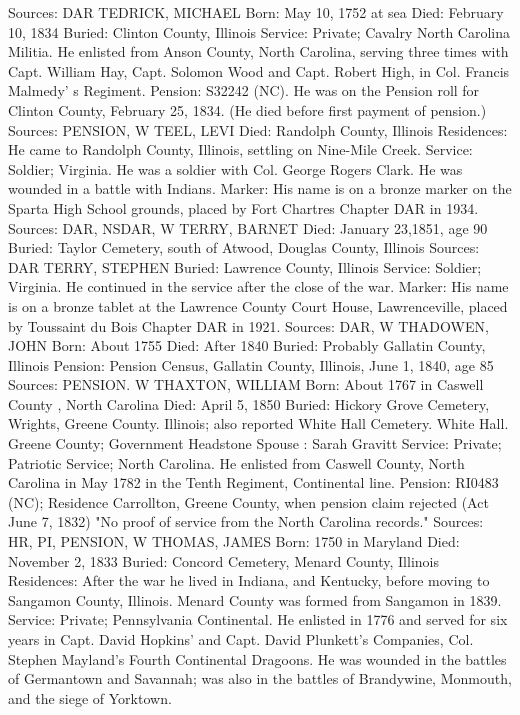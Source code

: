 Sources: DAR 
TEDRICK, MICHAEL 
Born: May 10, 1752 at sea
Died: February 10, 1834
Buried: Clinton County, Illinois
Service: Private; Cavalry North Carolina Militia. He enlisted from Anson County, North Carolina, serving three times with Capt. William Hay, Capt. Solomon Wood and Capt. Robert High, in Col. Francis Malmedy' s Regiment. 
Pension: S32242 (NC). He was on the Pension roll for Clinton County, February 25, 1834. (He died before first payment of pension.)
Sources: PENSION, W 
TEEL, LEVI
Died: Randolph County, Illinois Residences: He came to Randolph County, Illinois, settling on Nine-Mile Creek.
Service: Soldier; Virginia. He was a soldier with Col. George Rogers Clark. He was wounded in a battle with Indians.
Marker: His name is on a bronze marker on the Sparta High School grounds, placed by Fort Chartres Chapter DAR in 1934.
Sources: DAR, NSDAR, W 
TERRY, BARNET
Died: January 23,1851, age 90
Buried: Taylor Cemetery, south of Atwood, Douglas County, Illinois
Sources: DAR 
TERRY, STEPHEN
Buried: Lawrence County, Illinois
Service: Soldier; Virginia. He continued in the service after the close of the war.
Marker: His name is on a bronze tablet at the Lawrence County Court House, Lawrenceville, placed by Toussaint du Bois Chapter DAR in 1921.
Sources: DAR, W 
THADOWEN, JOHN
Born: About 1755
Died: After 1840
Buried: Probably Gallatin County, Illinois 
Pension: Pension Census, Gallatin County, Illinois, June 1, 1840, age 85
Sources: PENSION. W 
THAXTON, WILLIAM
Born: About 1767 in Caswell County , North Carolina
Died: April 5, 1850
Buried: Hickory Grove Cemetery, Wrights, Greene County. Illinois; also reported White Hall Cemetery. White Hall. Greene County; Government Headstone 
Spouse : Sarah Gravitt
Service: Private; Patriotic Service; North Carolina. He enlisted from Caswell County, North Carolina in May 1782 in the Tenth Regiment, Continental line. 
Pension: RI0483 (NC); Residence Carrollton, Greene County, when pension claim rejected (Act June 7, 1832) "No proof of service from the North Carolina records." 
Sources: HR, PI, PENSION, W 
THOMAS, JAMES
Born: 1750 in Maryland 
Died: November 2, 1833
Buried: Concord Cemetery, Menard County, Illinois 
Residences: After the war he lived in Indiana, and Kentucky, before moving to Sangamon County, Illinois. Menard County was formed from Sangamon in 1839. 
Service: Private; Pennsylvania Continental. He enlisted in 1776 and served for six years in Capt. David Hopkins' and Capt. David Plunkett's Companies, Col. Stephen Mayland's Fourth Continental Dragoons. He was wounded in the battles of Germantown and Savannah; was also in the battles of Brandy­wine, Monmouth, and the siege of Yorktown. 
